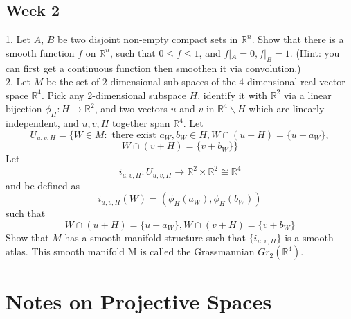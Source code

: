 \documentclass{article}
\theoremstyle{definition}
\begin{document}
\subsection{Week 2}

1. Let $A$, $B$ be two disjoint non-empty compact sets in $\mathbb{R}^n$. Show that there is a smooth function $f$ on $\mathbb{R}^n$, such that $0\leq f\leq 1$, and $f|_A=0, f|_B=1$. (Hint: you can first get a continuous function then smoothen it via convolution.)\\

2. Let $M$ be the set of $2$ dimensional sub spaces of the $4$ dimensional real vector space $\mathbb{R}^4$. Pick any 2-dimensional subspace $H$, identify it with $\mathbb{R}^2$ via a linear bijection $\phi_H: H\rightarrow \mathbb{R}^2$, and two vectors $u$ and $v$ in $\mathbb{R}^4\backslash H$ which are linearly independent, and $u, v, H$ together span $\mathbb{R}^4$. Let 
\[U_{u, v, H}=\{W\in M: \text{ there exist }a_W, b_W\in H, W\cap (u+H)=\{u+a_W\},\]
\[W\cap (v+H)=\{v+b_W\}\}\]
Let 
\[i_{u, v, H}: U_{u, v, H}\rightarrow \mathbb{R}^2\times \mathbb{R}^2\cong\mathbb{R}^4\]
and be defined as 
\[i_{u, v, H}(W)=(\phi_H(a_W), \phi_H(b_W))\]
such that
\[W\cap (u+H)=\{u+a_W\}, W\cap (v+H)=\{v+b_W\}\]
Show that $M$ has a smooth manifold structure such that $\{i_{u, v, H}\}$ is a smooth atlas. This smooth manifold M is called the Grassmannian $Gr_2(\mathbb{R}^4)$.

\section{Notes on Projective Spaces}
\end{document}
